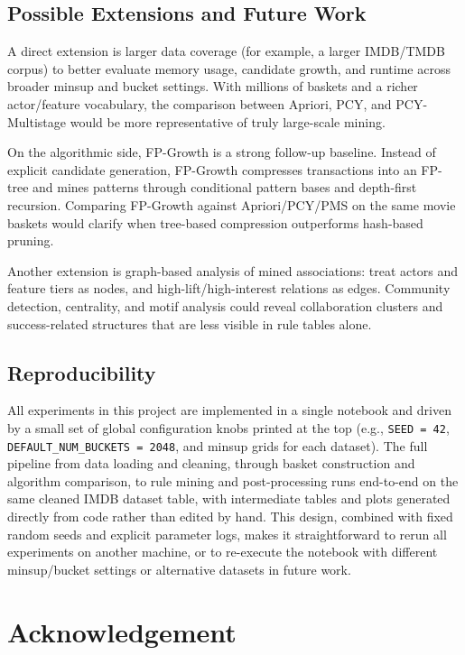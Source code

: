 \documentclass{article}  %
\begin{document}
\subsection{Possible Extensions and Future Work}

A direct extension is larger data coverage (for example, a larger IMDB/TMDB corpus) to better evaluate memory usage, candidate growth, and runtime across broader minsup and bucket settings. With millions of baskets and a richer actor/feature vocabulary, the comparison between Apriori, PCY, and PCY-Multistage would be more representative of truly large-scale mining.

On the algorithmic side, FP-Growth is a strong follow-up baseline. Instead of explicit candidate generation, FP-Growth compresses transactions into an FP-tree and mines patterns through conditional pattern bases and depth-first recursion. Comparing FP-Growth against Apriori/PCY/PMS on the same movie baskets would clarify when tree-based compression outperforms hash-based pruning.

Another extension is graph-based analysis of mined associations: treat actors and feature tiers as nodes, and high-lift/high-interest relations as edges. Community detection, centrality, and motif analysis could reveal collaboration clusters and success-related structures that are less visible in rule tables alone.

\subsection{Reproducibility}

All experiments in this project are implemented in a single notebook and driven by a small set of global configuration knobs printed at the top (e.g., \verb|SEED = 42|, \verb|DEFAULT_NUM_BUCKETS = 2048|, and minsup grids for each dataset). The full pipeline from data loading and cleaning, through basket construction and algorithm comparison, to rule mining and post-processing runs end-to-end on the same cleaned IMDB dataset table, with intermediate tables and plots generated directly from code rather than edited by hand. This design, combined with fixed random seeds and explicit parameter logs, makes it straightforward to rerun all experiments on another machine, or to re-execute the notebook with different minsup/bucket settings or alternative datasets in future work.



\section*{Acknowledgement}
\end{document}
